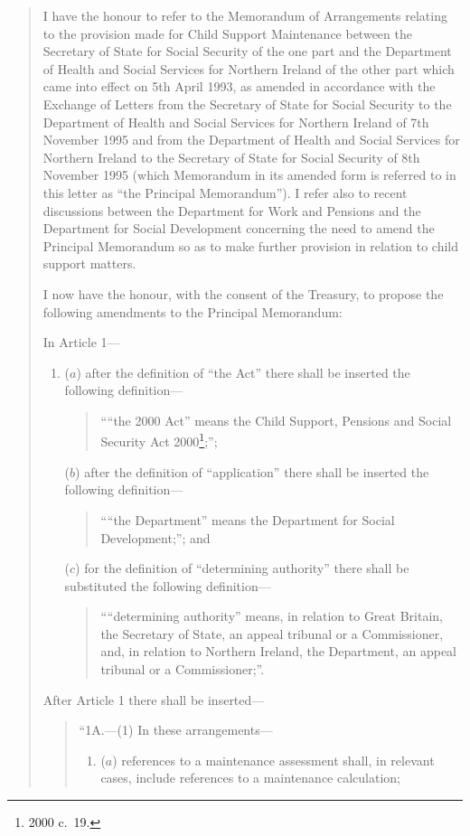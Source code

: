 \documentclass[12pt,a4paper]{article}
\begin{document}
\begin{quotation}
I have the honour to refer to the Memorandum of Arrangements relating to the provision made for Child Support Maintenance between the Secretary of State for Social Security of the one part and the Department of Health and Social Services for Northern Ireland of the other part which came into effect on 5th April 1993, as amended in accordance with the Exchange of Letters from the Secretary of State for Social Security to the Department of Health and Social Services for Northern Ireland of 7th November 1995 and from the Department of Health and Social Services for Northern Ireland to the Secretary of State for Social Security of 8th November 1995 (which Memorandum in its amended form is referred to in this letter as “the Principal Memorandum”). I refer also to recent discussions between the Department for Work and Pensions and the Department for Social Development concerning the need to amend the Principal Memorandum so as to make further provision in relation to child support matters.

I now have the honour, with the consent of the Treasury, to propose the following amendments to the Principal Memorandum:

In Article 1—
\begin{enumerate}\item[]
($a$) after the definition of “the Act” there shall be inserted the following definition—
\begin{quotation}
““the 2000 Act” means the Child Support, Pensions and Social Security Act 2000\footnote{2000 c.\ 19.};”;
\end{quotation}

($b$) after the definition of “application” there shall be inserted the following definition—
\begin{quotation}
““the Department” means the Department for Social Development;”; and
\end{quotation}

($c$) for the definition of “determining authority” there shall be substituted the following definition—
\begin{quotation}
    ““determining authority” means, in relation to Great Britain, the Secretary of State, an appeal tribunal or a Commissioner, and, in relation to Northern Ireland, the Department, an appeal tribunal or a Commissioner;”. 
\end{quotation}
\end{enumerate}

After Article 1 there shall be inserted—
\begin{quotation}
“1A.---(1)  In these arrangements—
\begin{enumerate}\item[]
($a$) references to a maintenance assessment shall, in relevant cases, include references to a maintenance calculation;


\end{enumerate}
\end{quotation}
\end{quotation}
\end{document}
